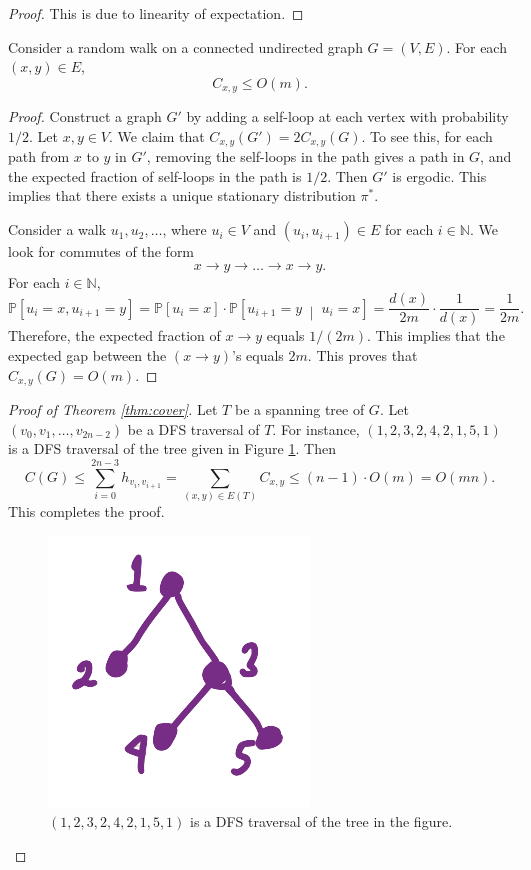 \documentclass[letterpaper, reqno,11pt]{article}
\newcommand{\NN}{\mathbb{N}}
\newcommand{\PP}{\mathbb{P}}
\begin{document}
\begin{proof}
  This is due to linearity of expectation.
\end{proof}

\begin{lemma}
  Consider a random walk on a connected undirected graph $G = (V, E)$. For each $(x, y) \in E$,
  $$ C_{x, y} \leq O(m). $$
\end{lemma}

\begin{proof}
  Construct a graph $G'$ by adding a self-loop at each vertex with probability $1/2$. Let $x, y \in V$. We claim that $C_{x, y}(G') = 2C_{x, y}(G)$. To see this, for each path from $x$ to $y$ in $G'$, removing the self-loops in the path gives a path in $G$, and the expected fraction of self-loops in the path is $1/2$. Then $G'$ is ergodic. This implies that there exists a unique stationary distribution $\pi^*$.

  Consider a walk $u_1, u_2, \ldots$, where $u_i \in V$ and $(u_i, u_{i + 1}) \in E$ for each $i \in \NN$. We look for commutes of the form
  $$ x \to y \to \ldots \to x \to y. $$
  For each $i \in \NN$,
  $$ \PP\left[u_i = x, u_{i + 1} = y\right] = \PP\left[u_i = x\right] \cdot \PP\left[u_{i + 1} = y \;\middle|\; u_i = x\right] = \frac{d(x)}{2m} \cdot \frac{1}{d(x)} = \frac{1}{2m}. $$
  Therefore, the expected fraction of $x \to y$ equals $1/(2m)$. This implies that the expected gap between the $(x \to y)$'s equals $2m$. This proves that $C_{x, y}(G) = O(m)$.
\end{proof}

\begin{proof}[Proof of Theorem \ref{thm:cover}]
  Let $T$ be a spanning tree of $G$. Let $(v_0, v_1, \ldots, v_{2n - 2})$ be a DFS traversal of $T$. For instance, $(1, 2, 3, 2, 4, 2, 1, 5, 1)$ is a DFS traversal of the tree given in Figure \ref{fig:dfs}. Then
  $$ C(G) \leq \sum_{i = 0}^{2n - 3} h_{v_i, v_{i + 1}} = \sum_{(x, y) \in E(T)} C_{x, y} \leq (n - 1) \cdot O(m) = O(mn). $$
  This completes the proof.

  \begin{figure}[h]
    \centering
    \includegraphics[width=.3\textwidth]{figures/dfs.png}
    \caption{$(1, 2, 3, 2, 4, 2, 1, 5, 1)$ is a DFS traversal of the tree in the figure.}
    \label{fig:dfs}
  \end{figure}
\end{proof}
\end{document}
